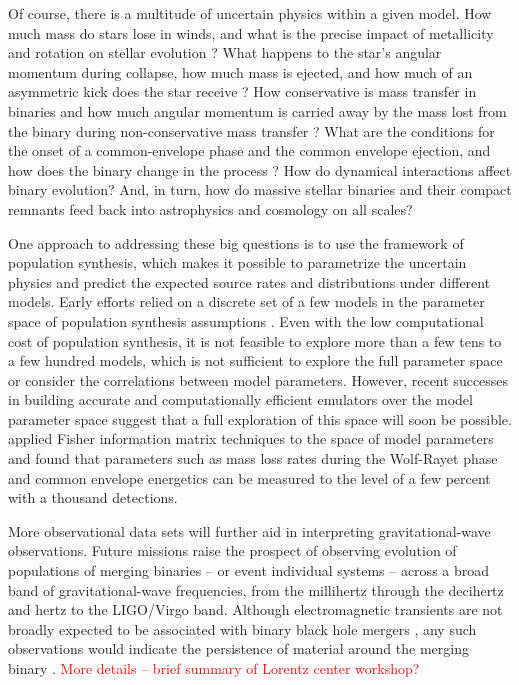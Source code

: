 \documentclass[iop,onecolumn]{revtex4}
\newcommand{\todo}[1]{\textcolor{red}{#1}}
\begin{document}
Of course, there is a multitude of uncertain physics within a given model.  How much mass do stars lose in winds, and what is the precise impact of metallicity and rotation on stellar evolution \citep[e.g.,][]{Renzo:2017}?  What happens to the star's angular momentum during collapse, how much mass is ejected, and how much of an asymmetric kick does the star receive \citep[e.g.,][]{Mirabel:2016}? How conservative is mass transfer in binaries and how much angular momentum is carried away by the mass lost from the binary during non-conservative mass transfer \citep[e.g.,][]{vandenHeuvel:2017}?  What are the conditions for the onset of a common-envelope phase and the common envelope ejection, and how does the binary change in the process \citep[e.g.,][]{Ivanova:2013}?   How do dynamical interactions affect binary evolution?  And, in turn, how do massive stellar binaries and their compact remnants feed back into astrophysics and cosmology on all scales?

One approach to addressing these big questions is to use the framework of population synthesis, which makes it possible to parametrize the uncertain physics and predict the expected source rates and distributions under different models.  Early  efforts relied on a discrete set of a few models in the parameter space of population synthesis assumptions \citep{Dominik:2012,Stevenson:2015}.  Even with the low computational cost of population synthesis, it is not feasible to explore more than a few tens to a few hundred models, which is not sufficient to explore the full parameter space or consider the correlations between model parameters.  However, recent successes in building accurate and computationally efficient emulators over the model parameter space \citep{Barrett:2017} suggest that a full exploration of this space will soon be possible. \citet{Barrett:2017FIM} applied Fisher information matrix techniques to the space of model parameters and found that parameters such as mass loss rates during the Wolf-Rayet phase and common envelope energetics can be measured to the level of a few percent with a thousand detections. 

More observational data sets will further aid in interpreting gravitational-wave observations.  Future missions raise the prospect of observing evolution of populations of merging binaries -- or event individual systems -- across a broad band of gravitational-wave frequencies, from the millihertz \citep[e.g.,[]{Sesana:2016} through the decihertz \citep{Mandel:2017} and hertz \citep{ET:2012} to the LIGO/Virgo band.  Although electromagnetic transients are not broadly expected to be associated with binary black hole mergers \citep[e.g.,][]{Lyutikov:2016}, any such observations would indicate the persistence of material around the merging binary \citep[e.g.,][]{deMinkKing:2017}.  \todo{More details -- brief summary of Lorentz center workshop?}
\end{document}

